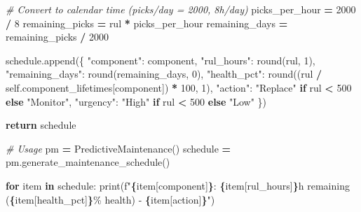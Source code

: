 \documentclass[
]{article}
\newenvironment{Shaded}{\begin{snugshade}}{\end{snugshade}}
\newcommand{\BuiltInTok}[1]{#1}
\newcommand{\CommentTok}[1]{\textcolor[rgb]{0.56,0.35,0.01}{\textit{#1}}}
\newcommand{\ControlFlowTok}[1]{\textcolor[rgb]{0.13,0.29,0.53}{\textbf{#1}}}
\newcommand{\DecValTok}[1]{\textcolor[rgb]{0.00,0.00,0.81}{#1}}
\newcommand{\KeywordTok}[1]{\textcolor[rgb]{0.13,0.29,0.53}{\textbf{#1}}}
\newcommand{\NormalTok}[1]{#1}
\newcommand{\OperatorTok}[1]{\textcolor[rgb]{0.81,0.36,0.00}{\textbf{#1}}}
\newcommand{\SpecialCharTok}[1]{\textcolor[rgb]{0.81,0.36,0.00}{\textbf{#1}}}
\newcommand{\SpecialStringTok}[1]{\textcolor[rgb]{0.31,0.60,0.02}{#1}}
\newcommand{\StringTok}[1]{\textcolor[rgb]{0.31,0.60,0.02}{#1}}
\newcommand{\VariableTok}[1]{\textcolor[rgb]{0.00,0.00,0.00}{#1}}
\begin{document}
\begin{Shaded}
\begin{Highlighting}[]
                \CommentTok{\# Convert to calendar time (picks/day = 2000, 8h/day)}
\NormalTok{                picks\_per\_hour }\OperatorTok{=} \DecValTok{2000} \OperatorTok{/} \DecValTok{8}
\NormalTok{                remaining\_picks }\OperatorTok{=}\NormalTok{ rul }\OperatorTok{*}\NormalTok{ picks\_per\_hour}
\NormalTok{                remaining\_days }\OperatorTok{=}\NormalTok{ remaining\_picks }\OperatorTok{/} \DecValTok{2000}

\NormalTok{                schedule.append(\{}
                    \StringTok{"component"}\NormalTok{: component,}
                    \StringTok{"rul\_hours"}\NormalTok{: }\BuiltInTok{round}\NormalTok{(rul, }\DecValTok{1}\NormalTok{),}
                    \StringTok{"remaining\_days"}\NormalTok{: }\BuiltInTok{round}\NormalTok{(remaining\_days, }\DecValTok{0}\NormalTok{),}
                    \StringTok{"health\_pct"}\NormalTok{: }\BuiltInTok{round}\NormalTok{((rul }\OperatorTok{/} \VariableTok{self}\NormalTok{.component\_lifetimes[component]) }\OperatorTok{*} \DecValTok{100}\NormalTok{, }\DecValTok{1}\NormalTok{),}
                    \StringTok{"action"}\NormalTok{: }\StringTok{"Replace"} \ControlFlowTok{if}\NormalTok{ rul }\OperatorTok{\textless{}} \DecValTok{500} \ControlFlowTok{else} \StringTok{"Monitor"}\NormalTok{,}
                    \StringTok{"urgency"}\NormalTok{: }\StringTok{"High"} \ControlFlowTok{if}\NormalTok{ rul }\OperatorTok{\textless{}} \DecValTok{500} \ControlFlowTok{else} \StringTok{"Low"}
\NormalTok{                \})}

        \ControlFlowTok{return}\NormalTok{ schedule}

\CommentTok{\# Usage}
\NormalTok{pm }\OperatorTok{=}\NormalTok{ PredictiveMaintenance()}
\NormalTok{schedule }\OperatorTok{=}\NormalTok{ pm.generate\_maintenance\_schedule()}

\ControlFlowTok{for}\NormalTok{ item }\KeywordTok{in}\NormalTok{ schedule:}
    \BuiltInTok{print}\NormalTok{(}\SpecialStringTok{f"}\SpecialCharTok{\{}\NormalTok{item[}\StringTok{\textquotesingle{}component\textquotesingle{}}\NormalTok{]}\SpecialCharTok{\}}\SpecialStringTok{: }\SpecialCharTok{\{}\NormalTok{item[}\StringTok{\textquotesingle{}rul\_hours\textquotesingle{}}\NormalTok{]}\SpecialCharTok{\}}\SpecialStringTok{h remaining (}\SpecialCharTok{\{}\NormalTok{item[}\StringTok{\textquotesingle{}health\_pct\textquotesingle{}}\NormalTok{]}\SpecialCharTok{\}}\SpecialStringTok{\% health) {-} }\SpecialCharTok{\{}\NormalTok{item[}\StringTok{\textquotesingle{}action\textquotesingle{}}\NormalTok{]}\SpecialCharTok{\}}\SpecialStringTok{"}\NormalTok{)}
\end{Highlighting}
\end{Shaded}
\end{document}
